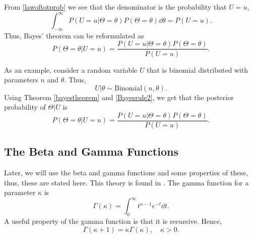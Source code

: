 From \eqref{lawoftotprob} we see that the denominator is the probability that $U=u$,
\begin{equation*}
    \int_{-\infty}^{\infty} P(U=u|\Theta=\theta)P(\Theta=\theta) \dd \theta = P(U=u).
\end{equation*}
Thus, Bayes' theorem can be reformulated as
\begin{equation}
    \label{Bayesrule2}
     P(\Theta=\theta|U=u) = \frac{P(U=u|\Theta=\theta)P(\Theta=\theta)}{P(U=u)}.
\end{equation}



As an example, consider a random variable $U$ that is binomial distributed with parameters $n$ and $\theta$. Thus,
\begin{equation*}
    U|\theta \sim \mathrm{Binomial}(n,\theta).
\end{equation*}
Using Theorem \ref{bayestheorem} and \eqref{Bayesrule2}, we get that the posterior probability of $\Theta|U$ is
\begin{equation*}
    P(\Theta=\theta|U=u) = \frac{P(U=u|\Theta=\theta)P(\Theta=\theta)}{P(U=u)}.
\end{equation*}


\subsection{The Beta and Gamma Functions}


Later, we will use the beta and gamma functions and some properties of these, thus, these are stated here. This theory is found in \citet{statinf}. The gamma function for a parameter $\kappa$ is 
\begin{equation*}
    \label{gamma_func}
    \Gamma(\kappa) = \int_0^\infty t^{\kappa-1}e^{-t} \dd t.
\end{equation*}
A useful property of the gamma function is that it is recursive. Hence,
\begin{equation*}
    \Gamma(\kappa+1) = \kappa \Gamma(\kappa), \quad \kappa>0 .
\end{equation*}

